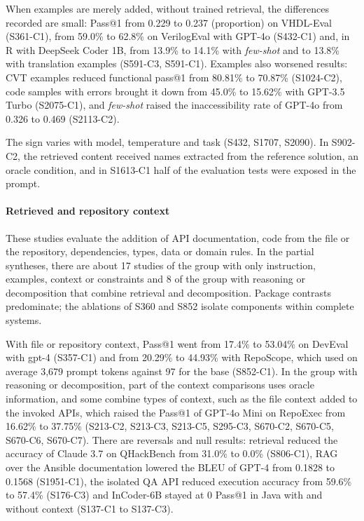 When examples are merely added, without trained retrieval, the differences recorded are small: Pass@1 from 0.229 to 0.237 (proportion) on VHDL-Eval (S361-C1), from 59.0\% to 62.8\% on VerilogEval with GPT-4o (S432-C1) and, in R with DeepSeek Coder 1B, from 13.9\% to 14.1\% with \textit{few-shot} and to 13.8\% with translation examples (S591-C3, S591-C1).
Examples also worsened results: CVT examples reduced functional pass@1 from 80.81\% to 70.87\% (S1024-C2), code samples with errors brought it down from 45.0\% to 15.62\% with GPT-3.5 Turbo (S2075-C1), and \textit{few-shot} raised the inaccessibility rate of GPT-4o from 0.326 to 0.469 (S2113-C2).

The sign varies with model, temperature and task (S432, S1707, S2090). In S902-C2, the retrieved content received names extracted from the reference solution, an oracle condition, and in S1613-C1 half of the evaluation tests were exposed in the prompt.

\paragraph{Retrieved and repository context}
These studies evaluate the addition of API documentation, code from the file or the repository, dependencies, types, data or domain rules. In the partial syntheses, there are about 17 studies of the group with only instruction, examples, context or constraints and 8 of the group with reasoning or decomposition that combine retrieval and decomposition. Package contrasts predominate; the ablations of S360 and S852 isolate components within complete systems.

With file or repository context, Pass@1 went from 17.4\% to 53.04\% on DevEval with gpt-4 (S357-C1) and from 20.29\% to 44.93\% with RepoScope, which used on average 3,679 prompt tokens against 97 for the base (S852-C1).
In the group with reasoning or decomposition, part of the context comparisons uses oracle information, and some combine types of context, such as the file context added to the invoked APIs, which raised the Pass@1 of GPT-4o Mini on RepoExec from 16.62\% to 37.75\% (S213-C2, S213-C3, S213-C5, S295-C3, S670-C2, S670-C5, S670-C6, S670-C7).
There are reversals and null results: retrieval reduced the accuracy of Claude 3.7 on QHackBench from 31.0\% to 0.0\% (S806-C1), RAG over the Ansible documentation lowered the BLEU of GPT-4 from 0.1828 to 0.1568 (S1951-C1), the isolated QA API reduced execution accuracy from 59.6\% to 57.4\% (S176-C3) and InCoder-6B stayed at 0 Pass@1 in Java with and without context (S137-C1 to S137-C3).

